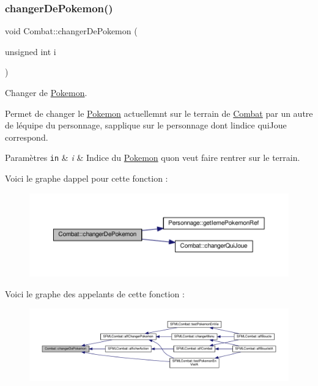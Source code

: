 \subsubsection{\texorpdfstring{changer\+De\+Pokemon()}{changerDePokemon()}}
{\footnotesize\ttfamily void Combat\+::changer\+De\+Pokemon (\begin{DoxyParamCaption}\item[{unsigned int}]{i }\end{DoxyParamCaption})}



Changer de \hyperlink{class_pokemon}{Pokemon}. 

Permet de changer le \hyperlink{class_pokemon}{Pokemon} actuellemnt sur le terrain de \hyperlink{class_combat}{Combat} par un autre de l\textquotesingle{}équipe du personnage, s\textquotesingle{}applique sur le personnage dont l\textquotesingle{}indice qui\+Joue correspond. 
\begin{DoxyParams}[1]{Paramètres}
\mbox{\tt in}  & {\em i} & Indice du \hyperlink{class_pokemon}{Pokemon} qu\textquotesingle{}on veut faire rentrer sur le terrain. \\
\hline
\end{DoxyParams}
Voici le graphe d\textquotesingle{}appel pour cette fonction \+:\nopagebreak
\begin{figure}[H]
\begin{center}
\leavevmode
\includegraphics[width=350pt]{class_combat_a567eab49812ecbd2d694e8cf064e800a_cgraph}
\end{center}
\end{figure}
Voici le graphe des appelants de cette fonction \+:\nopagebreak
\begin{figure}[H]
\begin{center}
\leavevmode
\includegraphics[width=350pt]{class_combat_a567eab49812ecbd2d694e8cf064e800a_icgraph}
\end{center}
\end{figure}
\mbox{\label{class_combat_a2848c91d76a09943dd5effb1904f1937}} 
